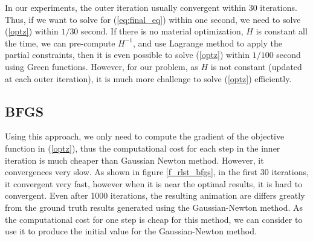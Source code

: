 \documentclass[9pt,twocolumn]{extarticle}
\newcommand{\argmin}{\operatornamewithlimits{arg\ min}}
\begin{document}
In our experiments, the outer iteration usually convergent within $30$
iterations. Thus, if we want to solve for (\ref{eq:final_eq}) within one second,
we need to solve (\ref{optz}) within $1/30$ second. If there is no material
optimization, $H$ is constant all the time, we can pre-compute $H^{-1}$, and use
Lagrange method to apply the partial constraints, then it is even possible to
solve (\ref{optz}) within $1/100$ second using Green functions. However, for our
problem, as $H$ is not constant (updated at each outer iteration), it is much
more challenge to solve (\ref{optz}) efficiently.

\subsection{BFGS}\label{sec:bfgs}
Using this approach, we only need to compute the gradient of the objective
function in (\ref{optz}), thus the computational cost for each step in the inner
iteration is much cheaper than Gaussian Newton method. However, it convergences
very slow. As shown in figure \ref{f_rlst_bfgs}, in the first 30 iterations, it
convergent very fast, however when it is near the optimal results, it is hard to
convergent. Even after 1000 iterations, the resulting animation are differs
greatly from the ground truth results generated using the Gaussian-Newton
method. As the computational cost for one step is cheap for this method, we can
consider to use it to produce the initial value for the Gaussian-Newton method.

\end{document}
